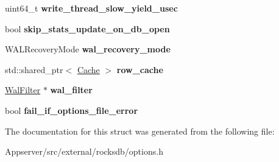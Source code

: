 \begin{DoxyCompactItemize}
\item 
uint64\+\_\+t {\bfseries write\+\_\+thread\+\_\+slow\+\_\+yield\+\_\+usec}\hypertarget{structrocksdb_1_1DBOptions_aa6bdd335a0bd7a1b335505faf31935f4}{}\label{structrocksdb_1_1DBOptions_aa6bdd335a0bd7a1b335505faf31935f4}

\item 
bool {\bfseries skip\+\_\+stats\+\_\+update\+\_\+on\+\_\+db\+\_\+open}\hypertarget{structrocksdb_1_1DBOptions_a019b1f46fb8a5f97b5e291ca33e8da5e}{}\label{structrocksdb_1_1DBOptions_a019b1f46fb8a5f97b5e291ca33e8da5e}

\item 
W\+A\+L\+Recovery\+Mode {\bfseries wal\+\_\+recovery\+\_\+mode}\hypertarget{structrocksdb_1_1DBOptions_af967c466aa612c9e5a777b44944653dc}{}\label{structrocksdb_1_1DBOptions_af967c466aa612c9e5a777b44944653dc}

\item 
std\+::shared\+\_\+ptr$<$ \hyperlink{classrocksdb_1_1Cache}{Cache} $>$ {\bfseries row\+\_\+cache}\hypertarget{structrocksdb_1_1DBOptions_ac272dc7a8a93351a7494ccfd128cac5a}{}\label{structrocksdb_1_1DBOptions_ac272dc7a8a93351a7494ccfd128cac5a}

\item 
\hyperlink{classrocksdb_1_1WalFilter}{Wal\+Filter} $\ast$ {\bfseries wal\+\_\+filter}\hypertarget{structrocksdb_1_1DBOptions_ad4a27b9f67d3c1f03fe77a09c26608ad}{}\label{structrocksdb_1_1DBOptions_ad4a27b9f67d3c1f03fe77a09c26608ad}

\item 
bool {\bfseries fail\+\_\+if\+\_\+options\+\_\+file\+\_\+error}\hypertarget{structrocksdb_1_1DBOptions_aa50efc7702bd62de3e8096d1afc9cdb4}{}\label{structrocksdb_1_1DBOptions_aa50efc7702bd62de3e8096d1afc9cdb4}

\end{DoxyCompactItemize}


The documentation for this struct was generated from the following file\+:\begin{DoxyCompactItemize}
\item 
Appserver/src/external/rocksdb/options.\+h\end{DoxyCompactItemize}
